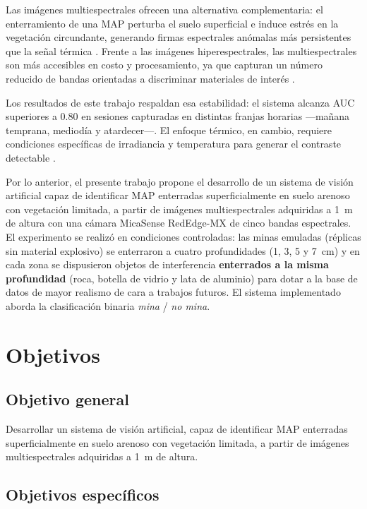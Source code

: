 Las imágenes multiespectrales ofrecen una alternativa complementaria: el
enterramiento de una \ac{MAP} perturba el suelo superficial e induce estrés
en la vegetación circundante, generando firmas espectrales anómalas más
persistentes que la señal térmica \cite{barnawi2022}. Frente a las imágenes
hiperespectrales, las multiespectrales son más accesibles en costo y
procesamiento, ya que capturan un número reducido de bandas orientadas a
discriminar materiales de interés \cite{makki2017}.

Los resultados de este trabajo respaldan esa estabilidad: el sistema
alcanza \ac{AUC} superiores a 0.80 en sesiones capturadas en distintas
franjas horarias ---mañana temprana, mediodía y atardecer---. El enfoque
térmico, en cambio, requiere condiciones específicas de irradiancia y
temperatura para generar el contraste detectable \cite{tenorio2024}.



Por lo anterior, el presente trabajo propone el desarrollo de un sistema de visión
artificial capaz de identificar \ac{MAP} enterradas superficialmente en suelo
arenoso con vegetación limitada, a partir de imágenes multiespectrales adquiridas
a \SI{1}{m} de altura con una cámara MicaSense RedEdge-MX de cinco bandas
espectrales. El experimento se realizó en condiciones controladas: las minas
emuladas (réplicas sin material explosivo) se enterraron a cuatro profundidades (1, 3, 5 y 7~cm) y en cada zona
se dispusieron objetos de interferencia \textbf{enterrados a la misma profundidad}
(roca, botella de vidrio y lata de aluminio) para dotar a la base de datos de
mayor realismo de cara a trabajos futuros. El sistema implementado aborda la
clasificación binaria \textit{mina} / \textit{no mina}.

\section{Objetivos}

\subsection*{Objetivo general}

Desarrollar un sistema de visión artificial, capaz de identificar \ac{MAP}
enterradas superficialmente en suelo arenoso con vegetación limitada, a partir de
imágenes multiespectrales adquiridas a \SI{1}{m} de altura.

\subsection*{Objetivos específicos}

